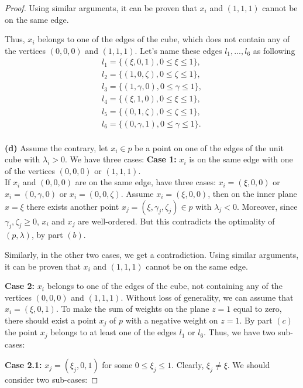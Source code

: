 \documentclass[10pt,a4paper]{amsart}
\begin{document}
\begin{proof}
Using similar arguments, it can be proven that \(x_i\) and \((1,1,1)\) cannot be on the same edge.

Thus, \(x_i\) belongs to one of the edges of the cube, which does not contain any of the vertices \((0,0,0)\) and \((1,1,1)\).
Let's name these edges \(l_1,...,l_6\) as following 
\begin{align*}    
    l_1=\{(\xi,0,1), 0 \le \xi \le 1\}, \\
    l_2=\{(1,0,\zeta), 0 \le \zeta \le 1\},\\
    l_3=\{(1,\gamma,0), 0 \le \gamma \le 1\}, \\
    l_4=\{(\xi,1,0), 0 \le \xi \le 1\},\\
    l_5=\{(0,1,\zeta), 0 \le \zeta \le 1\}, \\
    l_6=\{(0,\gamma,1), 0 \le \gamma \le 1\}.\\
\end{align*}

\textbf{(d)}
    Assume the contrary, let \(x_i \in p\) be a point on one of the edges of the unit cube with \(\lambda_i>0\). We have three cases:
    \textbf{Case 1:} \(x_i\) is on the same edge with one of the vertices \((0,0,0)\) or \((1,1,1)\).\\
    If \(x_i\) and \((0,0,0)\) are on the same edge, have three cases: \(x_i=(\xi,0,0)\) or \(x_i=(0,\gamma,0)\) or \(x_i=(0,0,\zeta)\). Assume \(x_i=(\xi,0,0)\), then on the inner plane \(x=\xi\) there exists another point \(x_j=(\xi,\gamma_j,\zeta_j) \in p\) with \(\lambda_j<0\). Moreover, since \(\gamma_j,\zeta_j \ge 0\), \(x_i\) and \(x_j\) are well-ordered. But this contradicts the optimality of \((p,\lambda)\), by part \((b)\). 
    
    Similarly, in the other two cases, we get a contradiction.
    Using similar arguments, it can be proven that \(x_i\) and \((1,1,1)\) cannot be on the same edge.
    
    \textbf{Case 2:} \(x_i\) belongs to one of the edges of the cube, not containing any of the vertices \((0,0,0)\) and \((1,1,1)\). Without loss of generality, we can assume that \(x_i=(\xi,0,1)\). To make the sum of weights on the plane \(z=1\) equal to zero, there should exist a point \(x_j\) of \(p\) with a negative weight on \(z=1\). By part \((c)\) the point \(x_j\) belongs to at least one of the edges \(l_1\) or \(l_6\). Thus, we have two sub-cases:
    
    \textbf{Case 2.1:} \(x_j=(\xi_j,0,1)\) for some \(0 \le \xi_j \le 1\).  Clearly, \(\xi_j \ne \xi\). We should consider two sub-cases:
    

\end{proof}
\end{document}
